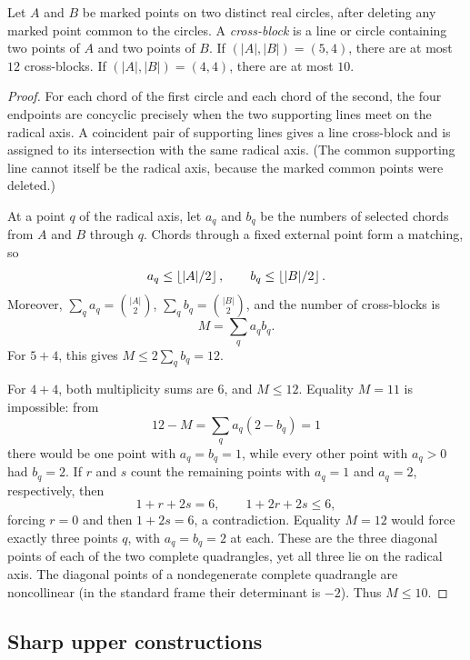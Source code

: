 \begin{lemma}
\label{lem:radical-axis-cross-block}
Let \(A\) and \(B\) be marked points on two distinct real circles, after
deleting any marked point common to the circles.  A \emph{cross-block} is a
line or circle containing two points of \(A\) and two points of \(B\).
If \((|A|,|B|)=(5,4)\), there are at most \(12\) cross-blocks.  If
\((|A|,|B|)=(4,4)\), there are at most \(10\).
\end{lemma}

\begin{proof}
For each chord of the first circle and each chord of the second, the four
endpoints are concyclic precisely when the two supporting lines meet on the
radical axis.  A coincident pair of supporting lines gives a line
cross-block and is assigned to its intersection with the same radical
axis.  (The common supporting line cannot itself be the radical axis,
because the marked common points were deleted.)

At a point \(q\) of the radical axis, let \(a_q\) and \(b_q\) be the
numbers of selected chords from \(A\) and \(B\) through \(q\).  Chords
through a fixed external point form a matching, so
\[
 a_q\leq\left\lfloor |A|/2\right\rfloor,\qquad b_q\leq\left\lfloor |B|/2\right\rfloor.
\]
Moreover, \(\sum_q a_q=\binom{|A|}{2}\),
\(\sum_q b_q=\binom{|B|}{2}\), and the number of cross-blocks is
\[
 M=\sum_q a_qb_q.
\]
For \(5+4\), this gives \(M\leq2\sum_qb_q=12\).

For \(4+4\), both multiplicity sums are \(6\), and \(M\leq12\).  Equality
\(M=11\) is impossible: from
\[
 12-M=\sum_q a_q(2-b_q)=1
\]
there would be one point with \(a_q=b_q=1\), while every other point with
\(a_q>0\) had \(b_q=2\).  If \(r\) and \(s\) count the remaining points
with \(a_q=1\) and \(a_q=2\), respectively, then
\[
 1+r+2s=6,\qquad 1+2r+2s\leq6,
\]
forcing \(r=0\) and then \(1+2s=6\), a contradiction.  Equality \(M=12\)
would force exactly three points \(q\), with
\(a_q=b_q=2\) at each.  These are the three diagonal points of each of the
two complete quadrangles, yet all three lie on the radical axis.  The
diagonal points of a nondegenerate complete quadrangle are noncollinear
(in the standard frame their determinant is \(-2\)).  Thus \(M\leq10\).
\end{proof}

\subsection{Sharp upper constructions}

